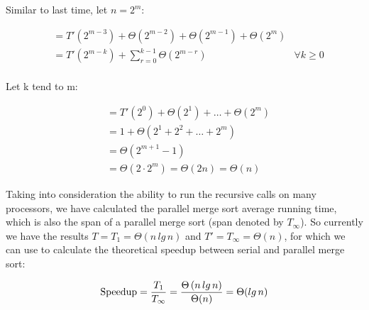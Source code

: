 \documentclass[12pt,twoside,notitlepage]{report}
\begin{document}
Similar to last time, let $n = 2^{m}$:

\begin{align*}
&= T'\left(2^{m-3}\right) + \Theta\left(2^{m-2}\right) + \Theta\left(2^{m-1}\right) + \Theta(2^{m}) \\
&= T'\left(2^{m-k}\right) + \sum_{r=0}^{k-1} \Theta\left(2^{m-r}\right) & \forall k \geq 0 \\
\end{align*}

Let k tend to m:

\begin{align*}
&= T'\left(2^{0}\right) + \Theta\left(2^{1}\right) + \ldots + \Theta\left(2^{m}\right) \\
&= 1 + \Theta\left(2^{1} + 2^{2} + \ldots + 2^{m}\right) \\
&= \Theta\left(2^{m+1} - 1\right) \\
&= \Theta\left(2\cdot2^{m}\right)
= \Theta\left(2n\right)
= \Theta\left(n\right)
\end{align*}

Taking into consideration the ability to run the recursive calls on many processors, we have calculated the parallel merge sort average running time, which is also the span of a parallel merge sort (span denoted by $T_\infty$). So
currently we have the results $T = T_{1} = \Theta(n\,lg\,n)$ and $T' = T_{\infty} = \Theta(n)$, for which we can use to calculate the theoretical speedup between serial and parallel merge sort:

\begin{align*}
\text{Speedup} = {T_{1} \over T_{\infty}} = {\Theta\left(n\,lg\,n\right) \over \Theta(n)} = \Theta(lg\,n)
\end{align*}
\end{document}
